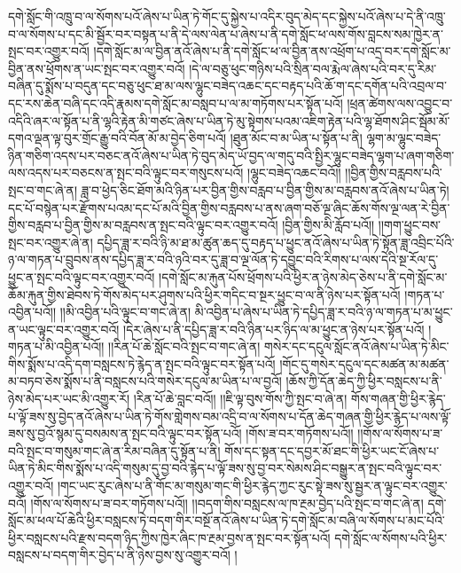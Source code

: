 དགེ་སློང་གི་འཁྲུ་བ་ལ་སོགས་པའོ་ཞེས་པ་ཡིན་ཏེ་གོང་དུ་སྐྱེས་པ་འདིར་བུད་མེད་དང་སྐྱེས་པའོ་ཞེས་པ་དེ་ནི་འཁྲུ་བ་ལ་སོགས་པ་དང་མི་སྦྱོར་བར་བསྟན་པ་ནི་དེ་ལས་ལེན་པ་ཞེས་པ་ནི་དགེ་སློང་ཕ་ལས་གོས་བླངས་སམ་ཁྱེར་ན་སྤང་བར་འགྱུར་བའོ། །དགེ་སློང་མ་ལ་བྱིན་ནའོ་ཞེས་པ་ནི་དགེ་སློང་ཕ་ལ་བྱིན་ནས་འཕྲོག་པ་འདྲ་བར་དགེ་སློང་མ་བྱིན་ནས་ཕྲོགས་ན་ཡང་སྤང་བར་འགྱུར་བའོ། །དེ་ལ་བཅུ་ཕུང་གཉིས་པའི་སྲིན་བལ་རྨེལ་ཞེས་པའི་བར་དུ་རིམ་བཞིན་དུ་སྨོས་པ་བདུན་དང་བཅུ་ཕུང་ཐ་མ་ལས་ལྷུང་བཟེད་འཆང་དང་བརྟད་པའི་ཆོ་ག་དང་དགོན་པའི་འབྲལ་བ་དང་རས་ཆེན་བཞི་དང་འདི་རྣམས་དགེ་སློང་མ་བསླབ་པ་ལ་མ་གཏོགས་པར་སྟོན་པའོ། །ཕྲན་ཚེགས་ལས་འབྱུང་བ་འདིའི་ཞར་ལ་སྟོན་པ་ནི་ལྷའི་རྟེན་མི་གཙང་ཞེས་པ་ཡིན་ཏེ་མུ་སྟེགས་པའམ་འཇིག་རྟེན་པའི་ལྷ་ཐོགས་ཤིང་སྦོམ་མོ་དགའ་ལྡན་ལྟ་བུར་གྲོང་རྒྱུ་བའི་བོན་མོ་མ་བྱེད་ཅིག་པའོ། །ཐུན་མོང་བ་མ་ཡིན་པ་སྟོན་པ་ནི། ལྷག་མ་ལྷུང་བཟེད་ཉིན་གཅིག་འདས་པར་བཅང་ནའོ་ཞེས་པ་ཡིན་ཏེ་བུད་མེད་ཡོ་བྱད་ལ་གདུ་བའི་སྤྱིར་ལྷུང་བཟེད་ལྷག་པ་ཞག་གཅིག་ལས་འདས་པར་བཅངས་ན་སྤང་བའི་ལྟུང་བར་གསུངས་པའོ། །ལྷུང་བཟེད་འཆང་བའོ།། །།བྱིན་གྱིས་བརླབས་པའི་སྤང་བ་གང་ཞེ་ན། ཟླ་བ་ཕྱེད་ཅིང་ཐོག་མའི་ཉིན་པར་བྱིན་གྱིས་བརླབ་པ་བྱིན་གྱིས་མ་བརླབས་ནའོ་ཞེས་པ་ཡིན་ཏེ། དང་པོ་བསྙེན་པར་རྫོགས་པའམ་དང་པོ་མའི་བྱིན་གྱིས་བརླབས་པ་ནས་ཞག་བཅོ་ལྔ་ཞིང་ཆོས་གོས་ལྔ་ལན་རེ་བྱིན་གྱིས་བརླབ་པ་བྱིན་གྱིས་མ་བརླབས་ན་སྤང་བའི་ལྟུང་བར་འགྱུར་བའོ། །བྱིན་གྱིས་མི་རློབ་པའོ།། །།གག་ཕྱུང་བས་སྤང་བར་འགྱུར་ཞེ་ན། དཔྱིད་ཟླ་ར་བའི་ཉི་མ་ཐ་མ་ཚུན་ཆད་དུ་བརྟད་པ་ཕྱུང་ནའོ་ཞེས་པ་ཡིན་ཏེ་སྟོན་ཟླ་འབྲིང་པོའི་ཉ་ལ་གཏན་པ་བྲུབས་ནས་དཔྱིད་ཟླ་ར་བའི་ཉའི་བར་དུ་ཟླ་བ་ལྔ་ལོན་ཏེ་དབྱུང་བའི་རིགས་པ་ལས་དེའི་སྔ་རོལ་དུ་ཕྱུང་ན་སྤང་བའི་ལྟུང་བར་འགྱུར་བའོ། །དགེ་སློང་མ་རྐུན་པོས་ཕྲོགས་པའི་ཕྱིར་ན་ཉེས་མེད་ཅེས་པ་ནི་དགེ་སློང་མ་ཆོམ་རྐུན་གྱིས་ཐེབས་ཏེ་གོས་མེད་པར་ཤུགས་པའི་ཕྱིར་གདིང་བ་སྔར་ཕྱུང་བ་ལ་ནི་ཉེས་པར་སྟོན་པའོ། །གཏན་པ་འབྱིན་པའོ།། །།མི་འབྱིན་པའི་ལྟུང་བ་གང་ཞེ་ན། མི་འབྱིན་པ་ཞེས་པ་ཡིན་ཏེ་དཔྱིད་ཟླ་ར་བའི་ཉ་ལ་གཏན་པ་མ་ཕྱུང་ན་ཡང་ལྟུང་བར་འགྱུར་བའོ། །དེར་ཞེས་པ་ནི་དཔྱིད་ཟླ་ར་བའི་ཉིན་པར་ཉིད་ལ་མ་ཕྱུང་ན་ཉེས་པར་སྟོན་པའོ། །གཏན་པ་མི་འབྱིན་པའོ།། །།རིན་པོ་ཆེ་སློང་བའི་སྤང་བ་གང་ཞེ་ན། གསེར་དང་དངུལ་སློང་ནའོ་ཞེས་པ་ཡིན་ཏེ་མིང་གིས་སྨོས་པ་འདི་དག་བསླངས་ཏེ་རྙེད་ན་སྤང་བའི་ལྟུང་བར་སྟོན་པའོ། །གོང་དུ་གསེར་དངུལ་དང་མཚན་མ་མཚན་མ་བཏབ་ཅེས་སྨོས་པ་ནི་བསླངས་པའི་གསེར་དངུལ་མ་ཡིན་པ་ལ་བྱའོ། །ཆོས་ཀྱི་དོན་ཆེད་ཀྱི་ཕྱིར་བསླངས་པ་ནི་ཉེས་མེད་པར་ཡང་མི་འགྱུར་རོ། །རིན་པོ་ཆེ་བླང་བའོ།། །།ཇི་ལྟ་བུས་གོས་ཀྱི་སྤང་བ་ཞེ་ན། གོས་གཞན་གྱི་ཕྱིར་རྙེད་པ་ལྟོ་ཟས་སུ་བྱེད་ནའོ་ཞེས་པ་ཡིན་ཏེ་གོས་གླེགས་བམ་འདྲི་བ་ལ་སོགས་པ་དོན་ཆེད་གཞན་གྱི་ཕྱིར་རྙེད་པ་ལས་ལྟོ་ཟས་སུ་བྱའོ་སྙམ་དུ་བསམས་ན་སྤང་བའི་ལྟུང་བར་སྟོན་པའོ། །གོས་ཟ་བར་གཏོགས་པའོ།། །།གོས་ལ་སོགས་པ་ཟ་བའི་སྤང་བ་གསུམ་གང་ཞེ་ན་རིམ་བཞིན་དུ་སྟོན་པ་ནི། གོས་དང་སྟན་དང་དབྱར་མོ་ཐང་གི་ཕྱིར་ཡང་ངོ་ཞེས་པ་ཡིན་ཏེ་མིང་གིས་སྨོས་པ་འདི་གསུམ་དུ་བྱ་བའི་རྙེད་པ་ལྟོ་ཟས་སུ་བྱ་བར་སེམས་ཤིང་བསྒྱུར་ན་སྤང་བའི་ལྟུང་བར་འགྱུར་བའོ། །གང་ཡང་རུང་ཞེས་པ་ནི་གོང་མ་གསུམ་གང་གི་ཕྱིར་རྙེད་ཀྱང་རུང་སྟེ་ཟས་སུ་སྦྱར་ན་ལྟུང་བར་འགྱུར་བའོ། །གོས་ལ་སོགས་པ་ཟ་བར་གཏོགས་པའོ།། །།བདག་གིས་བསླངས་ལ་ཁ་རྔམ་བྱེད་པའི་སྤང་བ་གང་ཞེ་ན། དགེ་སློང་མ་ཕལ་པོ་ཆེའི་ཕྱིར་བསླངས་ཏེ་བདག་གིར་བསྔོ་ནའོ་ཞེས་པ་ཡིན་ཏེ་དགེ་སློང་མ་བཞི་ལ་སོགས་པ་མང་པོའི་ཕྱིར་བསླངས་པའི་རྫས་བདག་ཉིད་ཀྱིས་ཁྱེར་ཞིང་ཁ་རྔམ་བྱས་ན་སྤང་བར་སྟོན་པའོ། དགེ་སློང་ལ་སོགས་པའི་ཕྱིར་བསླངས་པ་བདག་གིར་བྱེད་པ་ནི་ཉེས་བྱས་སུ་འགྱུར་བའོ། །
